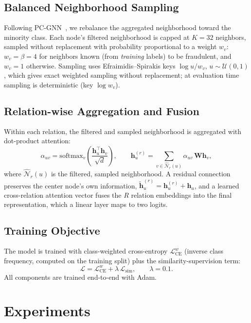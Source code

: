 \documentclass[conference]{IEEEtran}
\begin{document}
\subsection{Balanced Neighborhood Sampling}
Following PC-GNN~\cite{DBLP:conf/www/LiuAQCFYH21}, we rebalance the
aggregated neighborhood toward the minority class. Each node's filtered
neighborhood is capped at $K = 32$ neighbors, sampled without replacement
with probability proportional to a weight $w_v$: $w_v = \beta = 4$ for
neighbors known (from \emph{training} labels) to be fraudulent, and $w_v = 1$
otherwise. Sampling uses Efraimidis--Spirakis keys $\log u / w_v$,
$u \sim \mathcal{U}(0,1)$, which gives exact weighted sampling without
replacement; at evaluation time sampling is deterministic (key $\log w_v$).

\subsection{Relation-wise Aggregation and Fusion}
Within each relation, the filtered and sampled neighborhood is aggregated
with dot-product attention:
\begin{equation}
\alpha_{uv} = \mathrm{softmax}_{v}\!\left(\frac{\mathbf{h}_u^\top
\mathbf{h}_v}{\sqrt{d}}\right), \qquad
\mathbf{h}_u^{(r)} = \sum_{v \in \hat{\mathcal{N}}_r(u)} \alpha_{uv}\,
\mathbf{W} \mathbf{h}_v,
\end{equation}
where $\hat{\mathcal{N}}_r(u)$ is the filtered, sampled neighborhood. A
residual connection preserves the center node's own information,
$\tilde{\mathbf{h}}_u^{(r)} = \mathbf{h}_u^{(r)} + \mathbf{h}_u$, and a
learned cross-relation attention vector fuses the $R$ relation embeddings
into the final representation, which a linear layer maps to two logits.

\subsection{Training Objective}
The model is trained with class-weighted cross-entropy
$\mathcal{L}_{\text{CE}}^{w}$ (inverse class frequency, computed on the
training split) plus the similarity-supervision term:
\begin{equation}
\mathcal{L} = \mathcal{L}_{\text{CE}}^{w} + \lambda \,
\mathcal{L}_{\text{sim}}, \qquad \lambda = 0.1.
\end{equation}
All components are trained end-to-end with Adam.

\section{Experiments}
\end{document}
